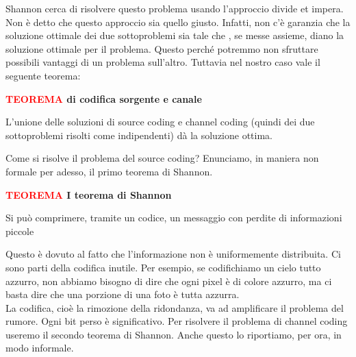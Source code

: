 \documentclass[12pt]{report}
\begin{document}
    \vspace{5px}
    \noindent
    Shannon cerca di risolvere questo problema usando l'approccio divide et impera. Non è detto che questo approccio sia quello giusto. Infatti, non c'è garanzia che la soluzione ottimale dei due sottoproblemi sia tale che , se messe assieme, diano la soluzione ottimale per il problema. Questo perché potremmo non sfruttare possibili vantaggi di un problema sull'altro. Tuttavia nel nostro caso vale il seguente teorema:
    \vspace{5px}
    \begin{tcolorbox}
        \textbf{\textcolor{red}{TEOREMA} di codifica sorgente e canale}
        \vspace{5px}
        \begin{center}
            L'unione delle soluzioni di source coding e channel coding (quindi dei due sottoproblemi risolti come indipendenti) dà la soluzione ottima.
        \end{center}
    \end{tcolorbox}

    \vspace{10px}

    \newpage
    \noindent Come si risolve il problema del source coding? Enunciamo, in maniera non formale per adesso, il primo teorema di Shannon.
    \vspace{5px}
    \begin{tcolorbox}
        \textbf{\textcolor{red}{TEOREMA} I teorema di Shannon}
        \vspace{5px}
        \begin{center}
            Si può comprimere, tramite un codice, un messaggio con perdite di informazioni piccole
        \end{center}
    \end{tcolorbox}
    \vspace{5px}
    \noindent Questo è dovuto al fatto che l'informazione non è uniformemente distribuita. Ci sono parti della codifica inutile. Per esempio, se codifichiamo un cielo tutto azzurro, non abbiamo bisogno di dire che ogni pixel è di colore azzurro, ma ci basta dire che una porzione di una foto è tutta azzurra.
    \\
    La codifica, cioè la rimozione della ridondanza, va ad amplificare il problema del rumore. Ogni bit perso è significativo. Per risolvere il problema di channel coding useremo il secondo teorema di Shannon. Anche questo lo riportiamo, per ora, in modo informale.
\end{document}
